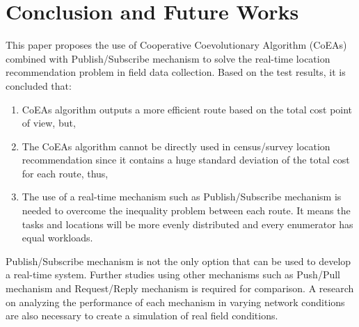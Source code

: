 \documentclass[conference]{IEEEtran}
\begin{document}
\section{Conclusion and Future Works}
\label{sec:conclusion-future-works}
This paper proposes the use of Cooperative Coevolutionary Algorithm (CoEAs) combined with Publish/Subscribe mechanism to solve the real-time location recommendation problem in field data collection. Based on the test results, it is concluded that: 

\begin{enumerate}
\item CoEAs algorithm outputs a more efficient route based on the total cost point of view, but, 
\item The CoEAs algorithm cannot be directly used in census/survey location recommendation since it contains a huge standard deviation of the total cost for each route, thus, 
\item The use of a real-time mechanism such as Publish/Subscribe mechanism is needed to overcome the inequality problem between each route. It means the tasks and locations will be more evenly distributed and every enumerator has equal workloads.
\end{enumerate}


Publish/Subscribe mechanism is not the only option that can be used to develop a real-time system. Further studies using other mechanisms such as Push/Pull mechanism and Request/Reply mechanism is required for comparison. A research on analyzing the performance of each mechanism in varying network conditions are also necessary to create a simulation of real field conditions.


%
%
\end{document}
